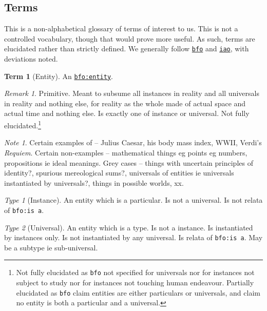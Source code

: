 \documentclass{amsart}%
\newcommand{\code}[1]{\texttt{#1}}%
\newcommand{\titleit}[1]{\textit{#1}}%
\theoremstyle{plain}
\theoremstyle{definition}
\theoremstyle{remark}
\newtheorem*{note}{Note}
\theoremstyle{definition}
\newtheorem{term}{Term}[subsection]%
\theoremstyle{remark}
\newtheorem*{term-type}{Type}
\newtheorem*{term-note}{Remark}
\begin{document}
\subsection{Terms}
\label{ss:terms}
This is a non-alphabetical glossary of terms of interest to us. This is not a controlled vocabulary, though that would prove more useful. As such, terms are elucidated rather than strictly defined. We generally follow \href{https://www.ebi.ac.uk/ols4/ontologies/bfo}{\code{bfo}} and \href{https://www.ebi.ac.uk/ols4/ontologies/iao}{\code{iao}}, with deviations noted.
%
%
%
%
%
\begin{term}[Entity]
\label{term:entity}
An \href{http://purl.obolibrary.org/obo/BFO_0000001}{\code{bfo:entity}}.
\begin{term-note}
Primitive. Meant to subsume all instances in reality %
and all universals in reality and nothing else, for reality as the whole made of actual space and actual time and nothing else. Is exactly one of instance or universal. Not fully elucidated.\footnote{Not fully elucidated as \code{bfo} not specified for universals nor for instances not subject to study nor for instances not touching human endeavour. %
%
%
Partially elucidated as \code{bfo} claim entities are either particulars or universals, and claim no entity is both a particular and a universal.}
\end{term-note}
\begin{note}
Certain examples of -- Julius Caesar, his body mass index, WWII, Verdi's \titleit{Requiem}. Certain non-examples -- mathematical things eg points eg numbers, propositions ie ideal meanings. Grey cases -- things with uncertain principles of identity?, spurious mereological sums?, universals of entities ie universals instantiated by universals?, things in possible worlds, xx.%
\end{note}
\begin{term-type}[Instance]
An entity which is a particular. Is not a universal. Is not relata of \code{bfo:is a}.
\end{term-type}
\begin{term-type}[Universal]
An entity which is a type. Is not a instance. Is instantiated by instances only. Is not instantiated by any universal. Is relata of \code{bfo:is a}. May be a subtype ie sub-universal.%
\end{term-type}
\end{term}
\end{document}
